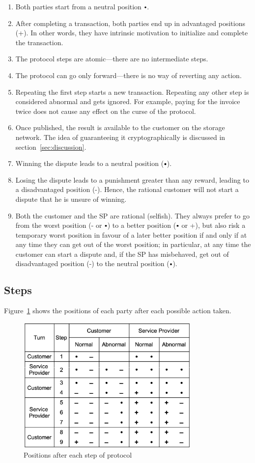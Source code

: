 \documentclass{ieeeaccess}
\newcommand{\plus}{+}
\newcommand{\minus}{-}
\newcommand\neutral[1][.75]{\mathbin{\ThisStyle{\vcenter{\hbox{%
  \scalebox{#1}{$\SavedStyle\bullet$}}}}}%
}
\begin{document}
\begin{enumerate}
\item Both parties start from a neutral position $\neutral$.
\item After completing a transaction, both parties end up in advantaged positions (\plus{}). In other words, they have intrinsic motivation to initialize and complete the transaction.
\item The protocol steps are atomic—there are no intermediate steps.
\item The protocol can go only forward—there is no way of reverting any action.
\item Repeating the first step starts a new transaction. Repeating any other step is considered abnormal and gets ignored. For example, paying for the invoice twice does not cause any effect on the curse of the protocol.
\item Once published, the result is available to the customer on the storage network. The idea of guaranteeing it cryptographically is discussed in section~\ref{sec:discussion}.
\item Winning the dispute leads to a neutral position ($\neutral$).
\item Losing the dispute leads to a punishment greater than any reward, leading to a disadvantaged position (\minus{}). Hence, the rational customer will not start a dispute that he is unsure of winning.
\item Both the customer and the SP are rational (selfish). They always prefer to go from the worst position (\minus{} or $\neutral${}) to a better position ($\neutral$ or \plus), but also risk a temporary worst position in favour of a later better position if and only if at any time they can get out of the worst position; in particular, at any time the customer can start a dispute and, if the SP has misbehaved, get out of disadvantaged position (\minus) to the neutral position ($\neutral$).
\end{enumerate}

\subsection{Steps}\label{sec:steps}

Figure~\ref{fig:positions} shows the positions of each party after each possible action taken.

\begin{figure}[h!]
\includegraphics[width=9cm]{formal-table-of-positions.png}
\centering
\caption{Positions after each step of protocol}
\label{fig:positions}
\end{figure}
\end{document}
